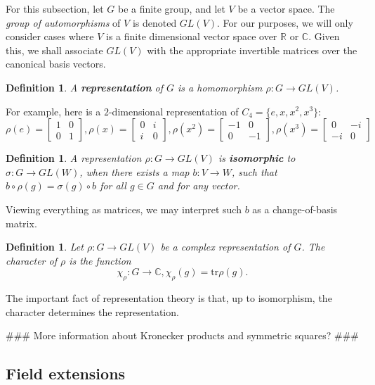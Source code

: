 \documentclass[11pt]{article}
\newtheorem{definition}[theorem]{Definition}
\begin{document}
For this subsection, let $G$ be a finite group, and let $V$ be a vector space.
The \textit{group of automorphisms} of $V$ is denoted $GL(V)$. For our purposes, we will only consider
cases where $V$ is a finite dimensional vector space over $\mathbb{R}$ or $\mathbb{C}$.
Given this, we shall associate $GL(V)$ with the appropriate invertible matrices over the canonical basis vectors.
\begin{definition}
  A \textbf{representation} of $G$ is a homomorphism $\rho: G \rightarrow GL(V)$.
\end{definition}
For example, here is a $2$-dimensional representation of $C_4 = \{e, x, x^2, x^3\}$:
\[\rho(e) = \begin{bmatrix}
  1 & 0 \\ 0 & 1
\end{bmatrix}, \rho(x) = \begin{bmatrix}
  0 & i \\ i & 0
\end{bmatrix}, \rho(x^2) = \begin{bmatrix}
  -1 & 0 \\ 0 & -1
\end{bmatrix}, \rho(x^3) = \begin{bmatrix}
  0 & -i \\ -i & 0
\end{bmatrix}\]
\begin{definition}
  A representation $\rho: G \rightarrow GL(V)$ is \textbf{isomorphic} to $\sigma: G \rightarrow GL(W)$, when there exists a map $b: V \rightarrow W$,
  such that $b \circ \rho(g) = \sigma(g) \circ b$ for all $g \in G$ and for any vector.
\end{definition}
Viewing everything as matrices, we may interpret such $b$ as a change-of-basis matrix.

\begin{definition}
  Let $\rho: G \rightarrow GL(V)$ be a complex representation of $G$. The character of $\rho$ is the function
  \[\chi_\rho: G \rightarrow \mathbb{C}, \chi_\rho(g) = \text{tr} \rho(g).\]
\end{definition}
The important fact of representation theory is that, up to isomorphism, the character determines the representation.

\#\#\# More information about Kronecker products and symmetric squares? \#\#\#

\subsection{Field extensions}
\end{document}
